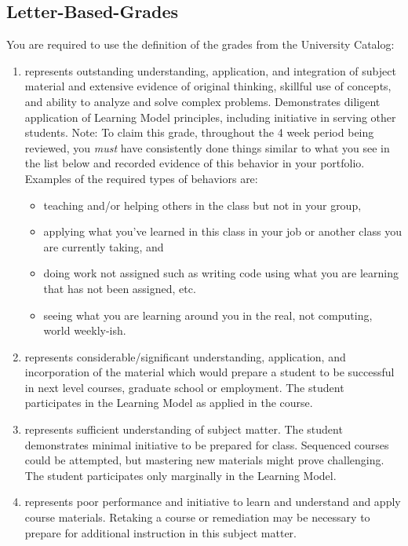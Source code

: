 \documentclass[12pt]{amsart}
\begin{document}
\subsection{Letter-Based-Grades}You are required to use the definition of the grades from the University Catalog:
\begin{enumerate}[label=\textbf{\Alph*}]
	\item represents outstanding understanding, application, and integration of subject material and extensive evidence of original thinking, skillful use of concepts, and ability to analyze and solve complex problems. Demonstrates diligent application of Learning Model principles, including initiative in serving other students.
	Note: To claim this grade, throughout the 4 week period being reviewed, you \textit{must} have consistently done things similar to what you see in the list below  and recorded evidence of this behavior in your portfolio. 
Examples of the required types of behaviors are:
\begin{itemize}  
\item teaching and/or helping others in the class but not in your group,
\item applying what you've learned in this class in your job or another class you are currently taking, and
\item doing work not assigned such as writing code using what you are learning that has not been assigned, etc.
\item seeing what you are learning around you in the real, not computing, world weekly-ish.
\end{itemize}

	\item represents considerable/significant understanding, application, and incorporation of the material which would prepare a student to be successful in next level courses, graduate school or employment. The student participates in the Learning Model as applied in the course. 
	\item represents sufficient understanding of subject matter. The student demonstrates minimal initiative to be prepared for class. Sequenced courses could be attempted, but mastering new materials might prove challenging. The student participates only marginally in the Learning Model.
	\item represents poor performance and initiative to learn and understand and apply course materials. Retaking a course or remediation may be necessary to prepare for additional instruction in this subject matter. 
\end{enumerate}
\end{document}

